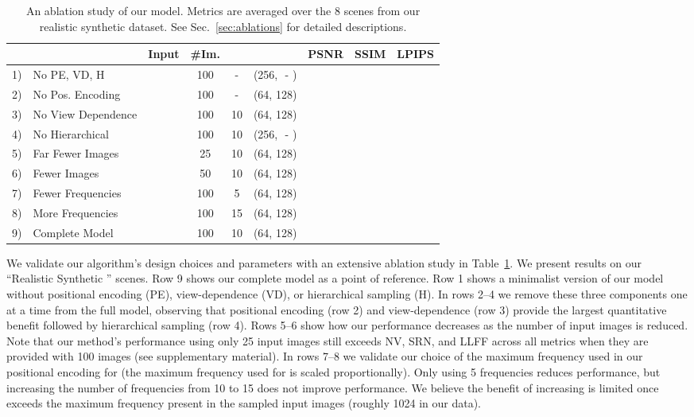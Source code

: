 \documentclass[runningheads]{llncs}
\begin{document}
\setlength{\tabcolsep}{4pt}
\begin{table}[t]
\centering
\begin{tabular}{@{\,}l@{\,\,}l|cccc|ccc@{\,}}
& & Input & \#Im. &  &  &  PSNR & SSIM & LPIPS  \\
\hline
1) & No PE, VD, H &  & 100 & -  & (256, \,\,-\,\,)    &   &  &   \\
2) & No Pos. Encoding &   & 100 & -  &  (64, 128)     &   &  &   \\
3) & No View Dependence &  & 100 & 10 &  (64, 128)    &   &  &   \\
4) & No Hierarchical &  & 100 & 10 & (256, \,\,-\,\,) &   &  &   \\
\arrayrulecolor{gray}
\hline
\arrayrulecolor{black}
5) & Far Fewer Images &   & 25  & 10 &  (64, 128)     &   &  &   \\
6) & Fewer Images  &   & 50  & 10 &  (64, 128)        &   &  &   \\
\arrayrulecolor{gray}
\hline
\arrayrulecolor{black}
7) & Fewer Frequencies &  & 100 & 5  &  (64, 128)     &   &  &   \\
8) & More Frequencies &  & 100 & 15 &  (64, 128)      &   &  &   \\
\arrayrulecolor{gray}
\hline
\arrayrulecolor{black}
9) & Complete Model &  & 100 & 10 & (64, 128)         &   &  &  
\end{tabular}\vspace{2mm}
\caption{An ablation study of our model. Metrics are averaged over the 8 scenes from our realistic synthetic dataset. See Sec.~\ref{sec:ablations} for detailed descriptions.
}
\label{table:ablations}
\end{table}
\setlength{\tabcolsep}{1.4pt} 
We validate our algorithm's design choices and parameters with an extensive ablation study in Table~\ref{table:ablations}. We present results on our ``Realistic Synthetic '' scenes. Row 9 shows our complete model as a point of reference.
Row 1 shows a minimalist version of our model without positional encoding (PE), view-dependence (VD), or hierarchical sampling (H). In rows 2--4 we remove these three components one at a time from the full model, observing that positional encoding (row 2) and view-dependence (row 3) provide the largest quantitative benefit followed by hierarchical sampling (row 4).
Rows 5--6 show how our performance decreases as the number of input images is reduced. Note that our method's performance using only 25 input images still exceeds NV, SRN, and LLFF across all metrics when they are provided with 100 images (see supplementary material).
In rows 7--8 we validate our choice of the maximum frequency  used in our positional encoding for  (the maximum frequency used for  is scaled proportionally). Only using 5 frequencies reduces performance, but increasing the number of frequencies from 10 to 15 does not improve performance. We believe the benefit of increasing  is limited once  exceeds the maximum frequency present in the sampled input images (roughly 1024 in our data).
\end{document}
